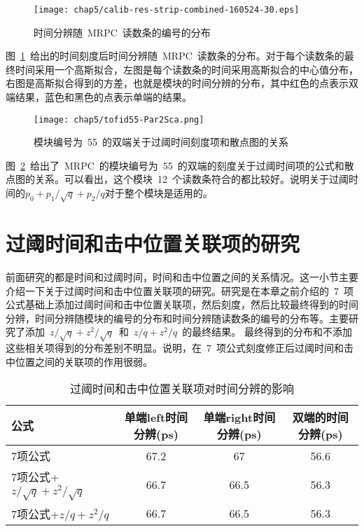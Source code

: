 \begin{figure}[!h]
\centering
\texttt{[image: chap5/calib-res-strip-combined-160524-30.eps]}
\caption{时间分辨随~MRPC~读数条的编号的分布}
\label{fig:calib-res-strip-combined-160524-30}
\end{figure}
图~\ref{fig:calib-res-strip-combined-160524-30}~给出的时间刻度后时间分辨随~MRPC~读数条的分布。对于每个读数条的最终时间采用一个高斯拟合，左图是每个读数条的时间采用高斯拟合的中心值分布，右图是高斯拟合得到的方差，也就是模块的时间分辨的分布，其中红色的点表示双端结果，蓝色和黑色的点表示单端的结果。

\begin{figure}[!h]
\centering
\texttt{[image: chap5/tofid55-Par2Sca.png]}
\caption{模块编号为~55~的双端关于过阈时间刻度项和散点图的关系}
\label{fig:tofid55-Par2Sca}
\end{figure}
图~\ref{fig:tofid55-Par2Sca}~给出了~MRPC~的模块编号为~55~的双端的刻度关于过阈时间项的公式和散点图的关系。可以看出，这个模块~12~个读数条符合的都比较好。说明关于过阈时间的$p_{0}+p_{1}/\sqrt{q}+p_{2}/q$对于整个模块是适用的。

\section{过阈时间和击中位置关联项的研究}
前面研究的都是时间和过阈时间，时间和击中位置之间的关系情况。这一小节主要介绍一下关于过阈时间和击中位置关联项的研究。研究是在本章之前介绍的~7~项公式基础上添加过阈时间和击中位置关联项，然后刻度，然后比较最终得到的时间分辨，时间分辨随模块的编号的分布和时间分辨随读数条的编号的分布等。主要研究了添加~$z/\sqrt{q}+z^{2}/\sqrt{q}$~和~$z/q+z^{2}/q$~的最终结果。
最终得到的分布和不添加这些相关项得到的分布差别不明显。说明，在~7~项公式刻度修正后过阈时间和击中位置之间的关联项的作用很弱。

\begin{table}[h]
    \centering
    \caption{\label{tbl:some-res} 过阈时间和击中位置关联项对时间分辨的影响}
  \footnotesize
    \begin{tabular}{lccc}
        \hline
        公式& 单端left时间分辨(ps)& 单端right时间分辨(ps)& 双端的时间分辨(ps)\\
        \hline
        7项公式& 67.2& 67& 56.6 \\
        7项公式+$z/\sqrt{q}+z^{2}/\sqrt{q}$& 66.7& 66.5& 56.3 \\
        7项公式+$z/q+z^{2}/q$& 66.7& 66.5& 56.3 \\
        \hline
    \end{tabular}
\end{table}


